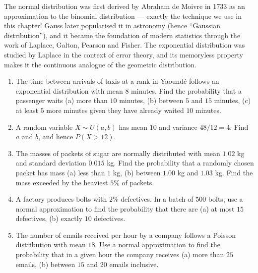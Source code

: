\documentclass[11pt]{article}
\begin{document}
\begin{savaistu}
The normal distribution was first derived by Abraham de Moivre in 1733 as an approximation to the binomial distribution — exactly the technique we use in this chapter! Gauss later popularised it in astronomy (hence ``Gaussian distribution''), and it became the foundation of modern statistics through the work of Laplace, Galton, Pearson and Fisher. The exponential distribution was studied by Laplace in the context of error theory, and its memoryless property makes it the continuous analogue of the geometric distribution.
\end{savaistu}

\begin{exercice}
\begin{enumerate}
\item The time between arrivals of taxis at a rank in Yaoundé follows an exponential distribution with mean $8$ minutes. Find the probability that a passenger waits (a) more than $10$ minutes, (b) between $5$ and $15$ minutes, (c) at least $5$ more minutes given they have already waited $10$ minutes.
\item A random variable $X \sim U(a, b)$ has mean $10$ and variance $48/12 = 4$. Find $a$ and $b$, and hence $P(X > 12)$.
\item The masses of packets of sugar are normally distributed with mean $1.02$ kg and standard deviation $0.015$ kg. Find the probability that a randomly chosen packet has mass (a) less than $1$ kg, (b) between $1.00$ kg and $1.03$ kg. Find the mass exceeded by the heaviest $5\%$ of packets.
\item A factory produces bolts with $2\%$ defectives. In a batch of $500$ bolts, use a normal approximation to find the probability that there are (a) at most $15$ defectives, (b) exactly $10$ defectives.
\item The number of emails received per hour by a company follows a Poisson distribution with mean $18$. Use a normal approximation to find the probability that in a given hour the company receives (a) more than $25$ emails, (b) between $15$ and $20$ emails inclusive.
\end{enumerate}
\end{exercice}
\end{document}
